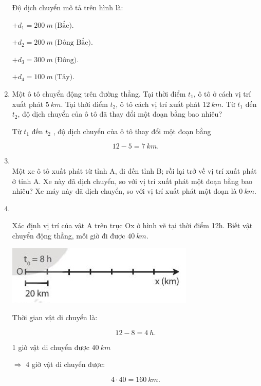 \begin{enumerate}[label=\bfseries Bài \arabic*:]
	\hideall
	{	
		Độ dịch chuyển mô tả trên hình là:
		
		$+ d_1 = \SI{200}{m}\ \text{(Bắc)}.$
		
		$+ d_2 = \SI{200}{m}\ \text{(Đông Bắc)}.$
		
		$+ d_3 = \SI{300}{m}\ \text{(Đông)}.$
		
		$+ d_4 = \SI{100}{m}\ \text{(Tây)}.$
		
		
	}

	\item {}
	
	
	{
		Một ô tô chuyển động trên đường thẳng. Tại thời điểm $t_1$, ô tô ở cách vị trí xuất phát $\SI{5}{km}$. Tại thời điểm $t_2$, ô tô cách vị trí xuất phát $\SI{12}{km}$. Từ $t_1$ đến $t_2$, độ dịch chuyển của ô tô đã thay đổi một đoạn bằng bao nhiêu?
		
	}
	
	\hideall
	{	
		Từ $t_1$ đến $t_2$ ,  độ dịch chuyển của ô tô thay đổi một đoạn bằng 
		
		$$12-5 = \SI{7}{km}.$$
	}
	\item {}\\
	{Một xe ô tô xuất phát từ tỉnh A, đi đến tỉnh B; rồi lại trở về vị trí xuất phát ở tỉnh A. Xe này đã dịch chuyển, so với vị trí xuất phát một đoạn bằng bao nhiêu? 
	}
	\hideall
	{Xe máy này đã dịch chuyển, so với vị trí xuất phát một đoạn là $\SI{0}{km}$.
	}

	\item {}\\
	{Xác định vị trí của vật A trên trục Ox ở hình vẽ tại thời điểm 12h. Biết vật chuyển động thẳng, mỗi giờ đi được $\SI{40}{km}$.
		
		\begin{center}
			\includegraphics[scale=1]{../figs/VN10-2022-PH-TP004-1.jpg}
		\end{center}
	}
	\hideall
	{	Thời gian vật di chuyển là:
		
		$$12 - 8 = \SI{4}{h}.$$
		
		1 giờ vật di chuyển được $\SI{40}{km}$
		
		$\Rightarrow$ 4 giờ vật di chuyển được: 
		
		$$4 \cdot 40 = \SI{160}{km}.$$
	}
	

\end{enumerate}
